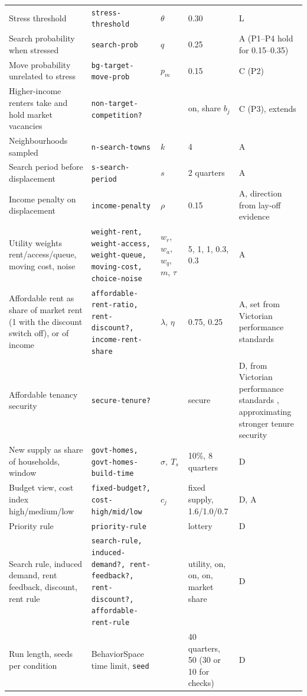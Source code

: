 \documentclass[10pt,a4paper]{article}
\begin{document}
\begin{table}[tp]
\begin{tabular}{L{3.5cm}L{3.5cm}L{1.6cm}L{2.3cm}L{3.0cm}}
Stress threshold & \texttt{\scriptsize stress-threshold} & $\theta$ & 0.30 & L \citep{25} \\
Search probability when stressed & \texttt{\scriptsize search-prob} & $q$ & 0.25 & A (P1--P4 hold for 0.15--0.35) \\
Move probability unrelated to stress & \texttt{\scriptsize bg-target-move-prob} & $p_m$ & 0.15 & C (P2) \\
Higher-income renters take and hold market vacancies & \texttt{\scriptsize non-target-competition?} & & on, share $b_j$ & C (P3), extends \citep{2} \\
Neighbourhoods sampled & \texttt{\scriptsize n-search-towns} & $k$ & 4 & A \\
Search period before displacement & \texttt{\scriptsize s-search-period} & $s$ & 2 quarters & A \\
Income penalty on displacement & \texttt{\scriptsize income-penalty} & $\rho$ & 0.15 & A, direction from lay-off evidence \citep{12} \\
Utility weights rent/access/queue, moving cost, noise & \texttt{\scriptsize weight-rent,\allowbreak{} weight-access,\allowbreak{} weight-queue,\allowbreak{} moving-cost,\allowbreak{} choice-noise} & $w_r$, $w_a$, $w_q$, $m$, $\tau$ & 5, 1, 1, 0.3, 0.3 & A \\
Affordable rent as share of market rent (1 with the discount switch off), or of income & \texttt{\scriptsize affordable-rent-ratio,\allowbreak{} rent-discount?,\allowbreak{} income-rent-share} & $\lambda$, $\eta$ & 0.75, 0.25 & A, set from Victorian performance standards \citep{30} \\
Affordable tenancy security & \texttt{\scriptsize secure-tenure?} & & secure & D, from Victorian performance standards \citep{30}, approximating stronger tenure security \\
New supply as share of households, window & \texttt{\scriptsize govt-homes,\allowbreak{} govt-homes-build-time} & $\sigma,\ T_s$ & 10\%, 8 quarters & D \\
Budget view, cost index high/medium/low & \texttt{\scriptsize fixed-budget?,\allowbreak{} cost-high/mid/low} & $c_j$ & fixed supply, 1.6/1.0/0.7 & D, A \\
Priority rule & \texttt{\scriptsize priority-rule} & & lottery & D \\
Search rule, induced demand, rent feedback, discount, rent rule & \texttt{\scriptsize search-rule,\allowbreak{} induced-demand?,\allowbreak{} rent-feedback?,\allowbreak{} rent-discount?,\allowbreak{} affordable-rent-rule} & & utility, on, on, on, market share & D \\
Run length, seeds per condition & \scriptsize BehaviorSpace time limit, \texttt{seed} & & 40 quarters, 50 (30 or 10 for checks) & D \\
\bottomrule
\end{tabular}
\end{table}
\end{document}
